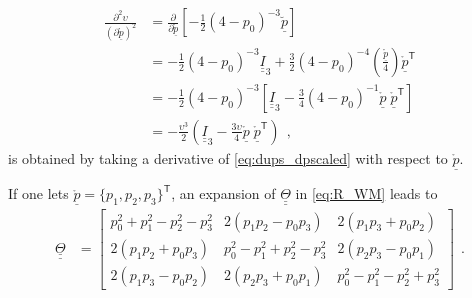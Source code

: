 \documentclass[12pt,a4paper,oneside,english]{abntex2} %
\newcommand{\vect}[1]{\underline{#1}}
\newcommand{\del}[2]{\frac{\partial#1}{\partial#2}}
\def\tens#1{\underline{\underline{#1}}}
\def\lb{\left[}
\def\rb{\right]}
\def\lp{\left(}
\def\rp{\right)}
\def\T{\mathsf{T}}
\def\Ithree{\tens{I}_3}
\def\p{\vect{p}}
\def\pscaled{\mathring{\p}}
\def\pext{\breve{\p}}
\def\Th{\tens{\Theta}}
\begin{document}
\begin{apendicesenv}
\begin{align}
    \frac{\partial^2\upsilon}{\lp\partial\pscaled\rp^2} &= \del{}{\pscaled} \lb-\frac{1}{2}\lp4-p_0\rp^{-3}\pext\rb
    \nonumber \\
    &= -\frac{1}{2}\lp4-p_0\rp^{-3}\Ithree + \frac{3}{2}\lp4-p_0\rp^{-4}\lp\frac{\pscaled}{4}\rp\pscaled^\T
    \nonumber \\
    &= -\frac{1}{2}\lp4-p_0\rp^{-3} \lb \Ithree - \frac{3}{4}\lp4-p_0\rp^{-1}\pscaled\;\pscaled^\T \rb
    \nonumber \\
    &= -\frac{\upsilon^3}{2} \lp \Ithree - \frac{3\upsilon}{4}\pscaled\;\pscaled^\T \rp \ \ ,
    \label{eq:d2ups_dpscaled2}
\end{align}
is obtained by taking a derivative of \cref{eq:dups_dpscaled} with respect to $\pscaled$.

If one lets $\pscaled=\{p_1,p_2,p_3\}^\T$, an expansion of $\Th$ in \cref{eq:R_WM} leads to
\begin{align}
    \Th &= 
    \begin{bmatrix}
    p_0^2+p_1^2-p_2^2-p_3^2 & 2\lp p_1p_2-p_0p_3 \rp & 2\lp p_1p_3+p_0p_2 \rp
    \\ 
     2\lp p_1p_2+p_0p_3 \rp & p_0^2-p_1^2+p_2^2-p_3^2 & 2\lp p_2p_3-p_0p_1 \rp
    \\ 
    2\lp p_1p_3-p_0p_2 \rp & 2\lp p_2p_3+p_0p_1 \rp & p_0^2-p_1^2-p_2^2+p_3^2
    \end{bmatrix} \ \ .
    \label{eq:T_explicit}
\end{align}


\end{apendicesenv}
\end{document}

